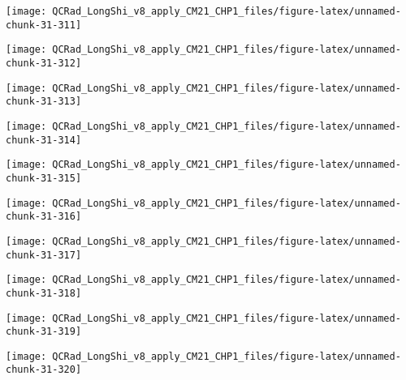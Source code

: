 \documentclass[
  10pt,
  a4paper,oneside]{article}
\begin{document}
\begin{center}\texttt{[image: QCRad\_LongShi\_v8\_apply\_CM21\_CHP1\_files/figure-latex/unnamed-chunk-31-311]} \end{center}

\begin{center}\texttt{[image: QCRad\_LongShi\_v8\_apply\_CM21\_CHP1\_files/figure-latex/unnamed-chunk-31-312]} \end{center}

\begin{center}\texttt{[image: QCRad\_LongShi\_v8\_apply\_CM21\_CHP1\_files/figure-latex/unnamed-chunk-31-313]} \end{center}

\begin{center}\texttt{[image: QCRad\_LongShi\_v8\_apply\_CM21\_CHP1\_files/figure-latex/unnamed-chunk-31-314]} \end{center}

\begin{center}\texttt{[image: QCRad\_LongShi\_v8\_apply\_CM21\_CHP1\_files/figure-latex/unnamed-chunk-31-315]} \end{center}

\begin{center}\texttt{[image: QCRad\_LongShi\_v8\_apply\_CM21\_CHP1\_files/figure-latex/unnamed-chunk-31-316]} \end{center}

\begin{center}\texttt{[image: QCRad\_LongShi\_v8\_apply\_CM21\_CHP1\_files/figure-latex/unnamed-chunk-31-317]} \end{center}

\begin{center}\texttt{[image: QCRad\_LongShi\_v8\_apply\_CM21\_CHP1\_files/figure-latex/unnamed-chunk-31-318]} \end{center}

\begin{center}\texttt{[image: QCRad\_LongShi\_v8\_apply\_CM21\_CHP1\_files/figure-latex/unnamed-chunk-31-319]} \end{center}

\begin{center}\texttt{[image: QCRad\_LongShi\_v8\_apply\_CM21\_CHP1\_files/figure-latex/unnamed-chunk-31-320]} \end{center}
\end{document}
